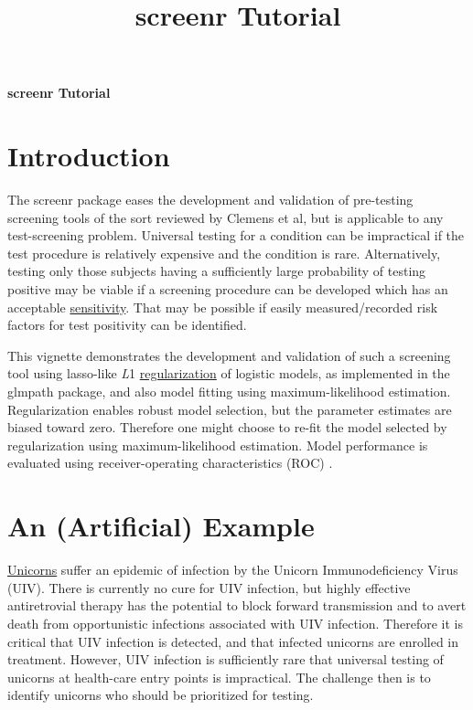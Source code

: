 \documentclass[11pt]{report}\usepackage[]{graphicx}\usepackage[]{xcolor}
\title{\textsf{\textbf{screenr Tutorial}}}
\begin{document}
\begin{center}
  \Huge{\textbf{screenr Tutorial}} \\
  \vspace{1em}
\end{center}

\section*{Introduction}

The \textsf{screenr} package eases the development and validation of
pre-testing screening tools of the sort reviewed by Clemens et
al\citep{Clemens+al2020}, but is applicable to any test-screening
problem. Universal testing for a condition can be impractical if the
test procedure is relatively expensive and the condition is rare.
Alternatively, testing only those subjects having a sufficiently large
probability of testing positive may be viable if a screening procedure
can be developed which has an acceptable
\href{https://en.wikipedia.org/wiki/Sensitivity_and_specificity}{sensitivity}.
That may be possible if easily measured/recorded risk factors for test
positivity can be identified.

This vignette demonstrates the development and validation of such a
screening tool using lasso-like \emph{L}1
\href{https://towardsdatascience.com/regularization-in-machine-learning-76441ddcf99a}{regularization}\citep{Hastie+al2009}
of logistic models, as implemented in the glmpath
package\citep{Park+Hastie2007}, and also model fitting using
maximum-likelihood estimation.  Regularization enables robust model
selection, but the parameter estimates are biased toward zero.
Therefore one might choose to re-fit the model selected by
regularization using maximum-likelihood estimation.  Model performance
is evaluated using receiver-operating characteristics (ROC)
\citep{Fawcett2006,Streiner+Cairney2007,Robin+al2011}.


\section*{An (Artificial) Example}

\href{https://www.britannica.com/topic/unicorn}{Unicorns} suffer an
epidemic of infection by the Unicorn Immunodeficiency Virus (UIV).
There is currently no cure for UIV infection, but highly effective
antiretrovial therapy has the potential to block forward
transmission and to avert death from opportunistic infections
associated with UIV infection.  Therefore it is critical
that UIV infection is detected, and that infected unicorns are
enrolled in treatment.  However, UIV infection is sufficiently rare
that universal testing of unicorns at health-care entry points is
impractical.  The challenge then is to identify
unicorns who should be prioritized for testing.
\end{document}
